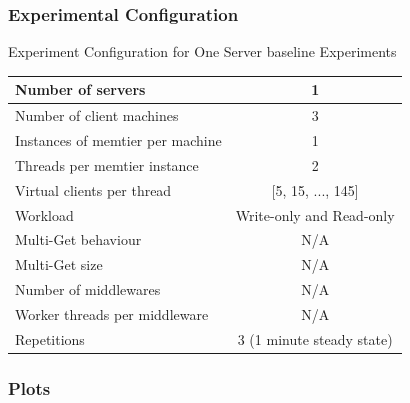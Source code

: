 \documentclass[11pt,a4paper]{article}
\begin{document}
\subsubsection{Experimental Configuration}
\begin{center}
	\scriptsize{
		Experiment Configuration for One Server baseline Experiments
		\begin{tabular}{|l|c|}
			\hline Number of servers                & 1                        \\ 
			\hline Number of client machines        & 3                        \\ 
			\hline Instances of memtier per machine & 1                        \\ 
			\hline Threads per memtier instance     & 2                        \\
			\hline Virtual clients per thread       & [5, 15, ..., 145]        \\ 
			\hline Workload                         & Write-only and Read-only \\
			\hline Multi-Get behaviour               & N/A                      \\
			\hline Multi-Get size                   & N/A                      \\
			\hline Number of middlewares            & N/A                      \\
			\hline Worker threads per middleware    & N/A                      \\
			\hline Repetitions                      & 3 (1 minute steady state)\\ 
			\hline 
		\end{tabular}
	} 
\end{center}

\subsubsection{Plots}
\end{document}
